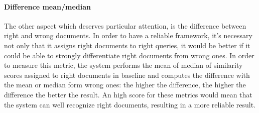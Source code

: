 \documentclass[\main/main.tex]{subfiles}
\begin{document}
\paragraph{Difference mean/median} The other aspect which deserves particular attention, is the difference between right and wrong documents. In order to have a reliable framework, it's necessary not only that it assigns right documents to right queries, it would be better if it could be able to strongly differentiate right documents from wrong ones. In order to measure this metric, the system performs the mean of median of similarity scores assigned to right documents in baseline and computes the difference with the mean or median form wrong ones: the higher the difference, the higher the difference the better the result. An high score for these metrics would mean that the system can well recognize right documents, resulting in a more reliable result. 
\end{document}
